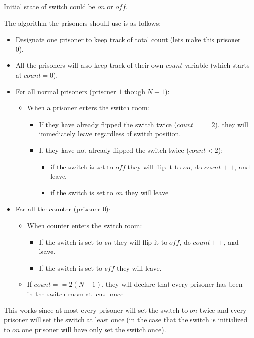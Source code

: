 \documentclass{article}
\begin{document}
Initial state of switch could be $on$ or $off$.

The algorithm the prisoners should use is as follows:
\begin{itemize}[label={}]
\item Designate one prisoner to keep track of total count (lets make this prisoner 0).
\item All the prisoners will also keep track of their own $count$ variable (which starts at $count=0$).

\item For all normal prisoners (prisoner $1$ though $N-1$):
	\begin{itemize}[label={}]
	\item When a prisoner enters the switch room:
		\begin{itemize}[label={}]
		\item If they have already flipped the switch twice ($count == 2$), they will immediately leave regardless of switch position.
		\item If they have not already flipped the switch twice ($count < 2$): 
			\begin{itemize}[label={}]
			\item if the switch is set to $off$ they will flip it to $on$, do $count++$, and leave.
			\item if the switch is set to $on$ they will leave.
			\end{itemize}
		\end{itemize}
	\end{itemize}
\item For all the counter (prisoner $0$):
	\begin{itemize}[label={}]
	\item When counter enters the switch room:
		\begin{itemize}[label={}]
		\item If the switch is set to $on$ they will flip it to $off$, do $count++$, and leave.
		\item If the switch is set to $off$ they will leave.
		\end{itemize}
	\item If $count == 2(N-1)$, they will declare that every prisoner has been in the switch room at least once.	
	\end{itemize}
\end{itemize}
This works since at most every prisoner will set the switch to $on$ twice and every prisoner will set the switch at least once (in the case that the switch is initialized to $on$ one prisoner will have only set the switch once).   
\end{document}
